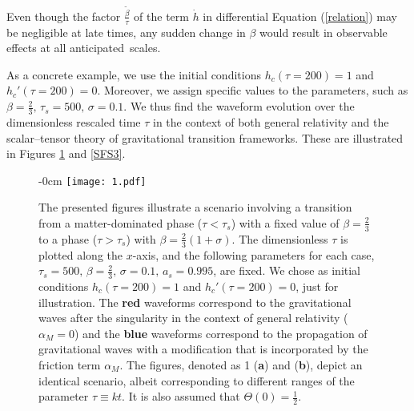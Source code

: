 \documentclass[universe,article,accept,moreauthors,pdftex]{Definitions/mdpi}
\begin{document}
Even though the factor $\frac{\tilde{\beta}}{\tau}$ of the term $\dot{h}$ in differential Equation (\ref{relation}) may be negligible at late times, any sudden change in $\beta$ would result in observable effects at all \mbox{anticipated scales.}

As a concrete example, we use the initial conditions  $h_{c}(\tau=200)=1$ and $h_{c}'(\tau=200)=0$. Moreover, we  assign specific values to the parameters, such as $\beta=\frac{2}{3},\,\tau_{s}=500,\,\sigma=0.1$. We thus find the waveform evolution over the dimensionless rescaled time $\tau$ in  the context of both general relativity and the scalar--tensor theory of gravitational transition frameworks. These are illustrated in Figures \ref{SFS2} and \ref{SFS3}. 

\begin{figure}[H] 

\begin{adjustwidth}{-\extralength}{0cm}
    \centering
    \texttt{[image: 1.pdf]}
\end{adjustwidth}
     \caption{ %
  {The} presented figures illustrate a scenario involving a transition from a matter-dominated phase ($\tau<\tau_{s}$) with a fixed value of $\beta=\frac{2}{3}$ to a phase ($\tau>\tau_{s}$) with $\beta=\frac{2}{3}(1+\sigma)$. The dimensionless $\tau$ is plotted along the $x$-axis, and the following parameters for each case,   $\tau_{s}=500,\,\beta=\frac{2}{3},\,\sigma=0.1,\, a_{s}=0.995$, are fixed. We chose  as initial conditions  $h_{c}(\tau=200)=1$ and $h_{c}'(\tau=200)=0$, just for illustration. The \textbf{red}  waveforms correspond to the gravitational waves after the singularity in the context of general relativity ($\alpha_{M}=0$) and the \textbf{blue} waveforms correspond to the propagation of gravitational waves with a modification that is incorporated by the friction term $\alpha_{M}$. The figures, denoted as 1 (\textbf{a}) and (\textbf{b}), depict an identical scenario, albeit corresponding to different ranges of the parameter $\tau\equiv kt$. It is also assumed that $\Theta(0) = \frac{1}{2}$. }
    \label{SFS2}
\end{figure}
\vspace{-6pt}
\end{document}
